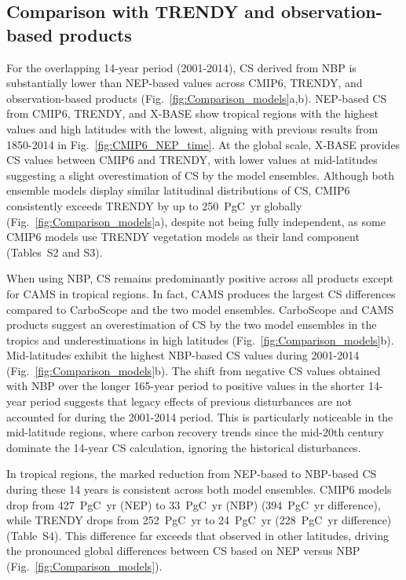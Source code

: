\documentclass[9pt,twocolumn,twoside]{pnas-new}
\begin{document}
\subsection*{Comparison with TRENDY and observation-based products}
For the overlapping 14-year period (2001-2014), CS derived from NBP is substantially lower than NEP-based values across CMIP6, TRENDY, and observation-based products (Fig.~\ref{fig:Comparison_models}a,b). NEP-based CS from CMIP6, TRENDY, and X-BASE show tropical regions with the highest values and high latitudes with the lowest, aligning with previous results from 1850-2014 in Fig.~\ref{fig:CMIP6_NEP_time}. 
At the global scale, X-BASE provides CS values between CMIP6 and TRENDY, with lower values at mid-latitudes suggesting a slight overestimation of CS by the model ensembles. Although both ensemble models display similar latitudinal distributions of CS, CMIP6 consistently exceeds TRENDY by up to 250~PgC~yr globally (Fig.~\ref{fig:Comparison_models}a), despite not being fully independent, as some CMIP6 models use TRENDY vegetation models as their land component (Tables~S2 and S3).

When using NBP, CS remains predominantly positive across all products except for CAMS in tropical regions. In fact, CAMS produces the largest CS differences compared to CarboScope and the two model ensembles. CarboScope and CAMS products suggest an overestimation of CS by the two model ensembles in the tropics and underestimations in high latitudes (Fig.~\ref{fig:Comparison_models}b).
Mid-latitudes exhibit the highest NBP-based CS values during 2001-2014 (Fig.~\ref{fig:Comparison_models}b). The shift from negative CS values obtained with NBP over the longer 165-year period to positive values in the shorter 14-year period suggests that legacy effects of previous disturbances are not accounted for during the 2001-2014 period. This is particularly noticeable in the mid-latitude regions, where carbon recovery trends since the mid-20th century dominate the 14-year CS calculation, ignoring the historical disturbances. 

In tropical regions, the marked reduction from NEP-based to NBP-based CS during these 14 years is consistent across both model ensembles. CMIP6 models drop from 427~PgC~yr (NEP) to 33~PgC~yr (NBP) (394~PgC~yr difference), while TRENDY drops from 252~PgC~yr to 24~PgC~yr (228~PgC~yr difference) (Table~S4). This difference far exceeds that observed in other latitudes, driving the pronounced global differences between CS based on NEP versus NBP (Fig.~\ref{fig:Comparison_models}). 
\end{document}
